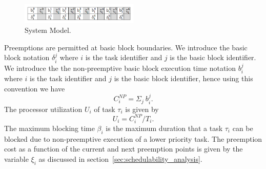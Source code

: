 \vspace{-20pt}
\begin{figure}[h!]
\begin{center}
\includegraphics[width=0.5\textwidth]{system_model.png}
\caption{System Model.}
\label{fig:system_model}
\end{center}
\vspace{-15pt}
\end{figure}
\noindent
Preemptions are permitted at basic block boundaries.  We introduce the basic block notation \begin{math}\delta_{i}^{j}\end{math} where $i$ is the task identifier and $j$ is the basic block identifier. We introduce the the non-preemptive basic block execution time notation \begin{math}b_{i}^{j}\end{math} where $i$ is the task identifier and $j$ is the basic block identifier, hence using this convention we have
\begin{equation}\label{eqn:c-np2}
    C_{i}^{NP} = \Sigma_{j}\ b_{i}^{j}.
\end{equation}
\noindent
The processor utilization \begin{math}U_{i}\end{math} of task \begin{math}\tau_{i}\end{math} is given by
\begin{equation}\label{eqn:u-task}
    U_{i} = C_{i}^{NP}/T_{i}.
\end{equation}
\noindent
The maximum blocking time $\beta_i$ is the maximum duration that a task $\tau_i$ can be blocked due to non-preemptive execution of a lower priority task. The preemption cost as a function of the current
and next preemption points is given by the variable $\xi_{i}$ as discussed in section~\ref{sec:schedulability_analysis}.
